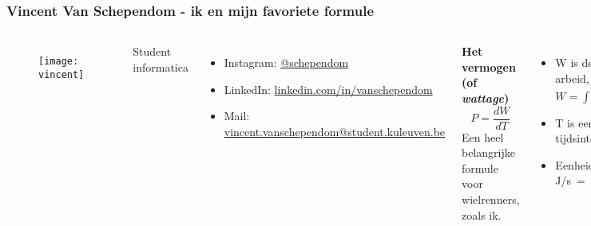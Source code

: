 \documentclass
[kulak] %
{kulakbeamer}
\begin{document}
	
	\begin{frame}
		\frametitle{Vincent Van Schependom - ik en mijn favoriete formule}
		\begin{columns}
			\begin{figure}
				\vspace*{-0.7cm}
				\texttt{[image: vincent]}
			\end{figure}
			Student informatica
			\begin{itemize}
				\item Instagram: \href{https://instagram.com/schependom}{@schependom}
				\item LinkedIn: \href{https://www.linkedin.com/in/vanschependom/}{linkedin.com/in/vanschependom}
				\item Mail: \\ \href{mailto:vincent.vanschependom@student.kuleuven.be}{ vincent.vanschependom@student.kuleuven.be}
			\end{itemize}
			\textbf{Het vermogen (of \textit{wattage})}
			\[P=\frac{dW}{dT}\]
			Een heel belangrijke formule voor wielrenners, zoals ik.
			\begin{itemize}
				\item W is de arbeid, met \(W=\int\vec{F}\cdot d\vec{r}\)
				\item T is een tijdsinterval
				\item Eenheid: \si{J/s = W}
			\end{itemize}
		\end{columns}
	\end{frame}
	
\end{document}
